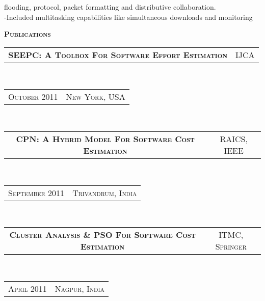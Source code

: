 \documentclass[10pt,a4paper,oneside]{article}
\begin{document}
\begin{minipage}[t]{0.63\textwidth}
\begin{adjustwidth}{7pt}{0pt}
{            flooding, protocol, packet formatting and distributive
            collaboration.\\
            -Included multitasking capabilities like simultaneous
            downloads and monitoring}\\
        \end{adjustwidth}
        \textcolor{light-gray}{\textbf{\large P\textsc{ublications}}}
        \vspace{10pt}\\
        \begin{tabular}{c|c}
            \textbf{\normalsize SEEPC: A T\textsc{oolbox}
            F\textsc{or} S\textsc{oftware} E\textsc{ffort}
        E\textsc{stimation}}
            &\textmd{\normalsize IJCA}
        \end{tabular}\\
        \textcolor{light-gray}{
            \begin{tabular}{c|c}
                {\small O\textsc{ctober 2011}}
                &{\small N\textsc{ew} Y\textsc{ork}, USA}
            \end{tabular}
        \vspace{10pt}
        }\\ 
        \begin{tabular}{c|c}
            \textbf{\normalsize CPN: A H\textsc{ybrid}
            M\textsc{odel} F\textsc{or} S\textsc{oftware}
        C\textsc{ost} E\textsc{stimation}}
            &\textmd{\normalsize RAICS, IEEE}
        \end{tabular}\\
        \textcolor{light-gray}{
            \begin{tabular}{c|c}
                {\small S\textsc{eptember 2011}}
                &{\small T\textsc{rivandrum}, I\textsc{ndia}}
            \end{tabular}
            \vspace{10pt}
        }\\ 
        \begin{tabular}{c|c}
            \textbf{\normalsize C\textsc{luster} A\textsc{nalysis} \& PSO F\textsc{or} S\textsc{oftware} C\textsc{ost} E\textsc{stimation}}
            &\textmd{\normalsize ITMC, S\textsc{pringer}}
        \end{tabular}\\
        \textcolor{light-gray}{
            \begin{tabular}{c|c}
                {\small A\textsc{pril 2011}}
                &{\small N\textsc{agpur}, I\textsc{ndia}}
            \end{tabular}
        }\\ 
    \end{minipage}
\end{document}
